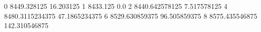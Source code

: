 0 8449.328125 16.203125
1 8433.125 0.0
2 8440.642578125 7.517578125
4 8480.3115234375 47.1865234375
6 8529.630859375 96.505859375
8 8575.435546875 142.310546875
